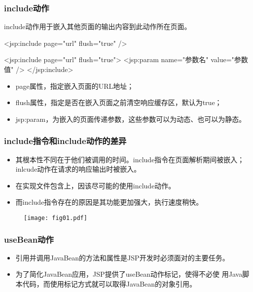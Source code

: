 \begin{frame} %
  \frametitle{include动作} 

  include动作用于嵌入其他页面的输出内容到此动作所在页面。


  \begin{jspCode}
    <jsp:include page="url" flush="true" />
  \end{jspCode}

  \begin{jspCode}
    <jsp:include page="url" flush="true">
      <jsp:param name="参数名" value="参数值" />
    </jsp:include>
  \end{jspCode}

\begin{itemize}
\item page属性，指定嵌入页面的URL地址；
\item flush属性，指定是否在嵌入页面之前清空响应缓存区，默认为true；
\item jsp:param，为嵌入的页面传递参数，这些参数可以为动态、也可以为静态。
\end{itemize}
\end{frame}

\begin{frame}[fragile] %
  \frametitle{include指令和include动作的差异} 
  \begin{itemize}
  \item 其根本性不同在于他们被调用的时间。include指令在页面解析期间被嵌入；inlcude动作在请求的响应输出时被嵌入。
  \item {\hei\Red 在实现文件包含上，因该尽可能的使用include动作。}
  \item 而include指令存在的原因是其功能更加强大，执行速度稍快。
  \end{itemize}

  \begin{figure}
    \centering
    \texttt{[image: fig01.pdf]}
  \end{figure}
\end{frame}


\begin{frame} %
  \frametitle{useBean动作} 
  \begin{itemize}
  \item 引用并调用JavaBean的方法和属性是JSP开发时必须面对的主要任务。
  \item 为了简化JavaBean应用，JSP提供了useBean动作标记，使得不必使
    用Java脚本代码，而使用标记方式就可以取得JavaBean的对象引用。
  \end{itemize}
\end{frame}

